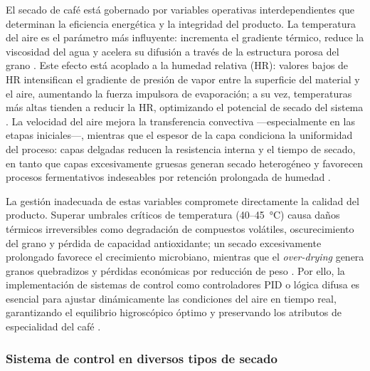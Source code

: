 El secado de café está gobernado por variables operativas interdependientes que 
determinan la eficiencia energética y la integridad del producto. La temperatura 
del aire es el parámetro más influyente: incrementa el gradiente térmico, reduce 
la viscosidad del agua y acelera su difusión a través de la estructura porosa del 
grano \parencite{abbaspour-gilandeh_effect_2021, 
institute_of_food_and_biotechnology_can_tho_university_vietnam_impact_2022, 
alves_influence_2020, phitakwinai_thinlayer_2019}. Este efecto está acoplado a la 
humedad relativa (HR): valores bajos de HR intensifican el gradiente de presión de 
vapor entre la superficie del material y el aire, aumentando la fuerza impulsora de 
evaporación; a su vez, temperaturas más altas tienden a reducir la HR, optimizando 
el potencial de secado del sistema \parencite{alves_physiological_2017, 
phitakwinai_thinlayer_2019, gomez-daza_innovacion_2023, p_romero_leiton_mathematical_2025}. 
La velocidad del aire mejora la transferencia convectiva —especialmente en las etapas 
iniciales—, mientras que el espesor de la capa condiciona la uniformidad del proceso: 
capas delgadas reducen la resistencia interna y el tiempo de secado, en tanto que 
capas excesivamente gruesas generan secado heterogéneo y favorecen procesos 
fermentativos indeseables por retención prolongada de humedad 
\parencite{alves_physiological_2017, amaral_simulation_2018, abdissa_harmonizing_2023}.

La gestión inadecuada de estas variables compromete directamente la calidad del 
producto. Superar umbrales críticos de temperatura (40--45~°C) causa daños térmicos 
irreversibles como degradación de compuestos volátiles, oscurecimiento del grano y 
pérdida de capacidad antioxidante; un secado excesivamente prolongado favorece el 
crecimiento microbiano, mientras que el \textit{over-drying} genera granos 
quebradizos y pérdidas económicas por reducción de peso 
\parencite{abdissa_harmonizing_2023, alves_physiological_2017, coelho_physicochemical_2024, 
abidin_improving_2024, abreu_influence_2025}. Por ello, la implementación de sistemas 
de control como controladores PID o lógica difusa es esencial para ajustar 
dinámicamente las condiciones del aire en tiempo real, garantizando el equilibrio 
higroscópico óptimo y preservando los atributos de especialidad del café 
\parencite{arifin_controlling_2024, nafisah_implementation_2024, yu_current_2025, 
coelho_physicochemical_2024, ordonez-lozano_monitoring_2025}.

\subsubsection{Sistema de control en diversos tipos de secado}

